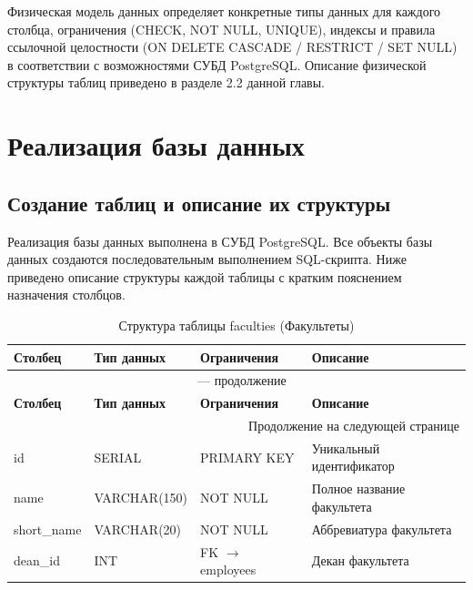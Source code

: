 \documentclass[14pt, a4paper]{extreport}
\begin{document}
Физическая модель данных определяет конкретные типы данных для каждого столбца, ограничения (CHECK, NOT NULL, UNIQUE), индексы и правила ссылочной целостности (ON DELETE CASCADE / RESTRICT / SET NULL) в соответствии с возможностями СУБД PostgreSQL. Описание физической структуры таблиц приведено в разделе 2.2 данной главы.

\section{Реализация базы данных}

\subsection{Создание таблиц и описание их структуры}
Реализация базы данных выполнена в СУБД PostgreSQL. Все объекты базы данных создаются последовательным выполнением SQL-скрипта. Ниже приведено описание структуры каждой таблицы с кратким пояснением назначения столбцов.

\begin{longtable}{p{3cm} p{3cm} p{4cm} p{4.5cm}}
\caption{Структура таблицы faculties (Факультеты)} \\
\toprule
\textbf{Столбец} & \textbf{Тип данных} & \textbf{Ограничения} & \textbf{Описание} \\
\midrule
\endfirsthead
\multicolumn{4}{c}{{\tablename\ \thetable{} --- продолжение}} \\
\toprule
\textbf{Столбец} & \textbf{Тип данных} & \textbf{Ограничения} & \textbf{Описание} \\
\midrule
\endhead
\midrule
\multicolumn{4}{r}{{Продолжение на следующей странице}} \\
\endfoot
\bottomrule
\endlastfoot
id & SERIAL & PRIMARY KEY & Уникальный идентификатор \\
name & VARCHAR(150) & NOT NULL & Полное название факультета \\
short\_name & VARCHAR(20) & NOT NULL & Аббревиатура факультета \\
dean\_id & INT & FK $\rightarrow$ employees & Декан факультета \\
\end{longtable}
\end{document}
